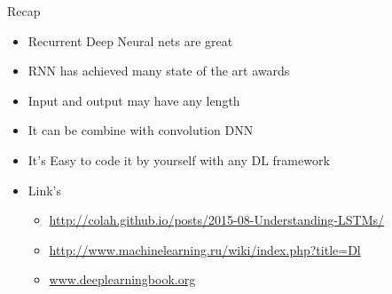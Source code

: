 \documentclass{beamer}
\begin{document}
\begin{frame}{Recap}
	\begin{itemize}
		\item Recurrent Deep Neural nets are great
		\item RNN has achieved many state of the art awards
		\item Input and output may have any length 
		\item It can be combine with convolution DNN
		\item It's Easy to code it by yourself with any DL framework
		\item Link's
			\begin{itemize}
				\item \href{http://colah.github.io/posts/2015-08-Understanding-LSTMs/}{http://colah.github.io/posts/2015-08-Understanding-LSTMs/}
				\item \href{http://www.machinelearning.ru/wiki/index.php?title=Dl} {http://www.machinelearning.ru/wiki/index.php?title=Dl} 
				\item \href{www.deeplearningbook.org}{www.deeplearningbook.org}
			\end{itemize}
	\end{itemize}
\end{frame}
\end{document}
